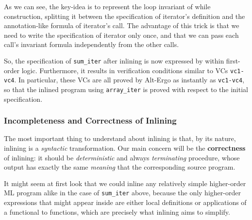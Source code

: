 \documentclass[a4paper,11pt,oneside]{article}
\theoremstyle{plain}
\begin{document}
As we can see, the key-idea is to represent the loop invariant of while construction, splitting it between the specification of iterator's definition and the annotation-like formula of iterator's call.
The advantage of this trick is that we need to write the specification of iterator only once, and that we can pass each call's invariant formula independently from the other calls.

	So, the specification of \texttt{sum\_iter} after inlining is now expressed by within first-order logic.
	Furthermore, it results in verification conditions similar to VCs \texttt{vc1-vc4}. 
	In particular, these VCs are all proved by Alt-Ergo as instantly as \texttt{vc1-vc4}, so that the inlined program using \texttt{array\_iter} is proved with respect to the initial specification.
 
 \subsubsection*{Incompleteness and Correctness of Inlining}
 
The most important thing to understand about inlining is that, by its
nature, inlining is a \textit{syntactic} transformation. 
Our main concern will be the \textbf{correctness} of inlining: it should be \textit{deterministic} and always \textit{terminating} procedure, whose output has exactly the same \textit{meaning} that the corresponding source program. 
 

It might seem at first look that we could inline any relatively simple higher-order ML program alike in the case of \texttt{sum\_iter} above, because the only higher-order expressions that might appear inside are either local definitions or applications of a functional to functions, which are precisely what inlining aims to simplify.	 
\end{document}
